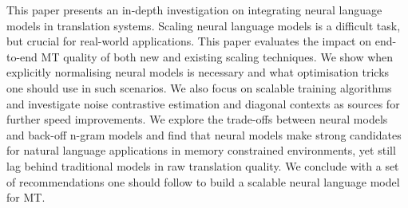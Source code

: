 This paper presents an in-depth investigation on integrating neural language models in translation systems. Scaling neural language models is a difficult task, but crucial for real-world applications. This paper evaluates the impact on end-to-end MT quality of both new and existing scaling techniques. We show when explicitly normalising neural models is necessary and what optimisation tricks one should use in such scenarios. We also focus on scalable training algorithms and investigate noise contrastive estimation and diagonal contexts as sources for further speed improvements. We explore the trade-offs between neural models and back-off n-gram models and find that neural models make strong candidates for natural language applications in memory constrained environments, yet still lag behind traditional models in raw translation quality. We conclude with a set of recommendations one should follow to build a scalable neural language model for MT.
